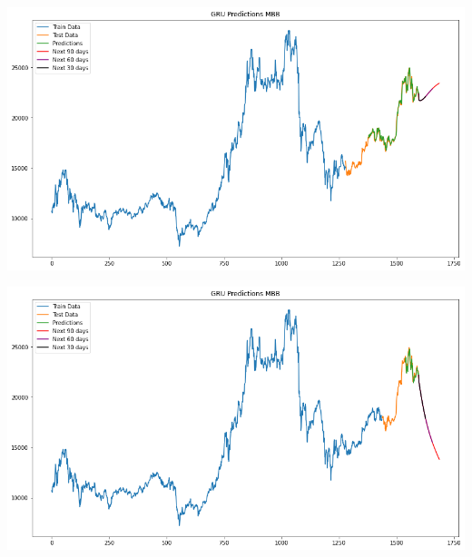 \documentclass[conference]{IEEEtran}
\begin{document}
\begin{minipage}{0.21\textwidth}
    \centering
    \includegraphics[width=\linewidth]{images/GRU/GRU_MBB_82.png}
    \label{fig:image1}
\end{minipage}
\hfill
\begin{minipage}{0.21\textwidth}
    \centering
    \includegraphics[width=\linewidth]{images/GRU/GRU_MBB_91.png}
    \label{fig:image2}
\end{minipage}
\end{document}
